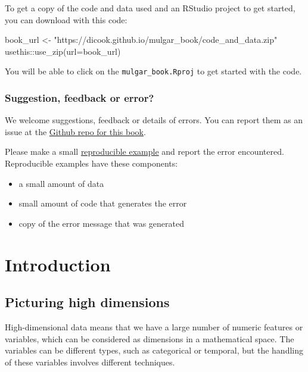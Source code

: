 \documentclass[
  letterpaper,
]{krantz}
\newenvironment{Shaded}{\begin{snugshade}}{\end{snugshade}}
\newcommand{\AttributeTok}[1]{\textcolor[rgb]{0.40,0.45,0.13}{#1}}
\newcommand{\FunctionTok}[1]{\textcolor[rgb]{0.28,0.35,0.67}{#1}}
\newcommand{\NormalTok}[1]{\textcolor[rgb]{0.00,0.23,0.31}{#1}}
\newcommand{\OtherTok}[1]{\textcolor[rgb]{0.00,0.23,0.31}{#1}}
\newcommand{\SpecialCharTok}[1]{\textcolor[rgb]{0.37,0.37,0.37}{#1}}
\newcommand{\StringTok}[1]{\textcolor[rgb]{0.13,0.47,0.30}{#1}}
\providecommand{\tightlist}{%
  \setlength{\itemsep}{0pt}\setlength{\parskip}{0pt}}\usepackage{longtable,booktabs,array}
\begin{document}
To get a copy of the code and data used and an RStudio project to get
started, you can download with this code:

\begin{Shaded}
\begin{Highlighting}[]
\NormalTok{book\_url }\OtherTok{\textless{}{-}} \StringTok{"https://dicook.github.io/mulgar\_book/code\_and\_data.zip"}
\NormalTok{usethis}\SpecialCharTok{::}\FunctionTok{use\_zip}\NormalTok{(}\AttributeTok{url=}\NormalTok{book\_url)}
\end{Highlighting}
\end{Shaded}

You will be able to click on the \texttt{mulgar\_book.Rproj} to get
started with the code.

\hypertarget{suggestion-feedback-or-error}{%
\section*{Suggestion, feedback or
error?}\label{suggestion-feedback-or-error}}


We welcome suggestions, feedback or details of errors. You can report
them as an issue at the
\href{https://github.com/dicook/mulgar_book}{Github repo for this book}.

Please make a small \href{https://reprex.tidyverse.org}{reproducible
example} and report the error encountered. Reproducible examples have
these components:

\begin{itemize}
\tightlist
\item
  a small amount of data
\item
  small amount of code that generates the error
\item
  copy of the error message that was generated
\end{itemize}

\part{Introduction}

\hypertarget{intro}{%
\chapter{Picturing high dimensions}\label{intro}}

High-dimensional data means that we have a large number of numeric
features or variables, which can be considered as dimensions in a
mathematical space. The variables can be different types, such as
categorical or temporal, but the handling of these variables involves
different techniques. 
 
\end{document}
